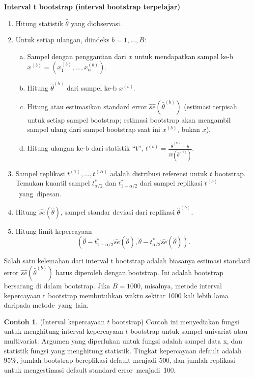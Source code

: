 \documentclass[a4paper,12pt]{article}
\theoremstyle{definition}
\newtheorem{example}{Contoh}[section]
\begin{document}
\textbf{Interval t bootstrap (interval bootstrap terpelajar)}
\begin{enumerate}[1.]
    \item Hitung statistik $\hat{\theta}$ yang diobservasi.
    \item Untuk setiap ulangan, diindeks $b = 1, ..., B$:
        \begin{enumerate}[(a)]
            \item Sampel dengan penggantian dari $x$ untuk mendapatkan sampel ke-b $x^{(b)} = (x_{1}^{(b)}, ..., x_{n}^{(b)})$.
            \item Hitung $\hat{\theta}^{(b)}$ dari sampel ke-b $x^{(b)}$.
            \item Hitung atau estimasikan standard error $\widehat{se}(\hat{\theta}^{(b)})$ (estimasi terpisah untuk setiap sampel bootstrap; estimasi bootstrap akan mengambil sampel ulang dari sampel bootstrap saat ini $x^{(b)}$, bukan $x$).
            \item Hitung ulangan ke-b dari statistik “t”, $t^{(b)} = \frac{\hat{\theta}^{(b)}-\hat{\theta}}{\widehat{se}(\hat{\theta}^{(b)})}$.
        \end{enumerate}
    \item Sampel replikasi $t^{(1)}, ..., t^{(B)}$ adalah distribusi referensi untuk $t$ bootstrap. Temukan kuantil sampel $t_{\alpha/2}^{*}$ dan $t_{1-\alpha/2}^{*}$ dari sampel replikasi $t^{(b)}$ yang dipesan. 
    \item Hitung $\widehat{se}(\hat{\theta})$, sampel standar deviasi dari replikasi $\hat{\theta}^{(b)}$.
    \item Hitung limit kepercayaan
    \begin{equation*}
    (\hat{\theta}-t_{1-\alpha/2}^{*}\widehat{se}(\hat{\theta}),     \hat{\theta}-t_{\alpha/2}^{*}\widehat{se}(\hat{\theta})).
    \end{equation*}
\end{enumerate}

Salah satu kelemahan dari interval t bootstrap adalah biasanya estimasi standard error $\widehat{se}(\hat{\theta}^{(b)})$ harus diperoleh dengan bootstrap. Ini adalah bootstrap bersarang di dalam bootstrap. Jika $B = 1000$, misalnya, metode interval kepercayaan t bootstrap membutuhkan waktu sekitar 1000 kali lebih lama daripada metode yang lain.
\begin{example} (Interval kepercayaan $t$ bootstrap)
Contoh ini menyediakan fungsi untuk menghitung interval kepercayaan $t$ bootstrap untuk sampel univariat atau multivariat. Argumen yang diperlukan untuk fungsi adalah sampel data x, dan statistik fungsi yang menghitung statistik. Tingkat kepercayaan default adalah 95\%, jumlah bootstrap bereplikasi default menjadi 500, dan jumlah replikasi untuk mengestimasi default standard error menjadi 100.
\end{example}
\end{document}

